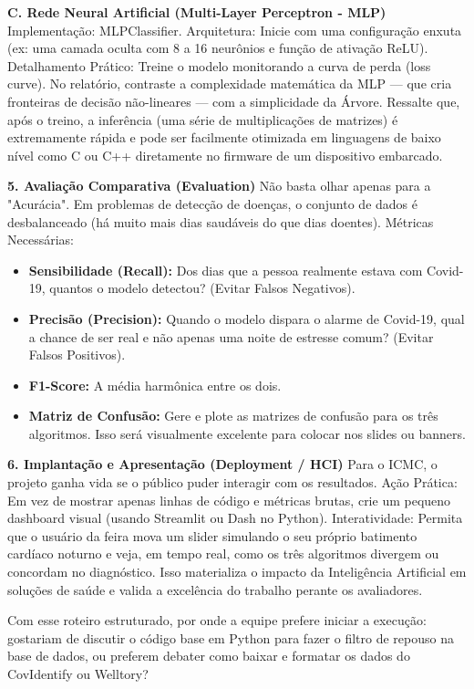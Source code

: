 \begin{description}
    \textbf{C. Rede Neural Artificial (Multi-Layer Perceptron - MLP)}
    Implementação: MLPClassifier.
    Arquitetura: Inicie com uma configuração enxuta (ex: uma camada oculta com 8 a 16 neurônios e função de ativação ReLU).
    Detalhamento Prático: Treine o modelo monitorando a curva de perda (loss curve). No relatório, contraste a complexidade matemática da MLP — que cria fronteiras de decisão não-lineares — com a simplicidade da Árvore. Ressalte que, após o treino, a inferência (uma série de multiplicações de matrizes) é extremamente rápida e pode ser facilmente otimizada em linguagens de baixo nível como C ou C++ diretamente no firmware de um dispositivo embarcado.

    \textbf{5. Avaliação Comparativa (Evaluation)}
    Não basta olhar apenas para a "Acurácia". Em problemas de detecção de doenças, o conjunto de dados é desbalanceado (há muito mais dias saudáveis do que dias doentes).
    Métricas Necessárias:
    \begin{itemize}
        \item \textbf{Sensibilidade (Recall):} Dos dias que a pessoa realmente estava com Covid-19, quantos o modelo detectou? (Evitar Falsos Negativos).
        \item \textbf{Precisão (Precision):} Quando o modelo dispara o alarme de Covid-19, qual a chance de ser real e não apenas uma noite de estresse comum? (Evitar Falsos Positivos).
        \item \textbf{F1-Score:} A média harmônica entre os dois.
        \item \textbf{Matriz de Confusão:} Gere e plote as matrizes de confusão para os três algoritmos. Isso será visualmente excelente para colocar nos slides ou banners.
    \end{itemize}

    \textbf{6. Implantação e Apresentação (Deployment / HCI)}
    Para o ICMC, o projeto ganha vida se o público puder interagir com os resultados.
    Ação Prática: Em vez de mostrar apenas linhas de código e métricas brutas, crie um pequeno dashboard visual (usando Streamlit ou Dash no Python).
    Interatividade: Permita que o usuário da feira mova um slider simulando o seu próprio batimento cardíaco noturno e veja, em tempo real, como os três algoritmos divergem ou concordam no diagnóstico. Isso materializa o impacto da Inteligência Artificial em soluções de saúde e valida a excelência do trabalho perante os avaliadores.

    Com esse roteiro estruturado, por onde a equipe prefere iniciar a execução: gostariam de discutir o código base em Python para fazer o filtro de repouso na base de dados, ou preferem debater como baixar e formatar os dados do CovIdentify ou Welltory?


\end{description}
